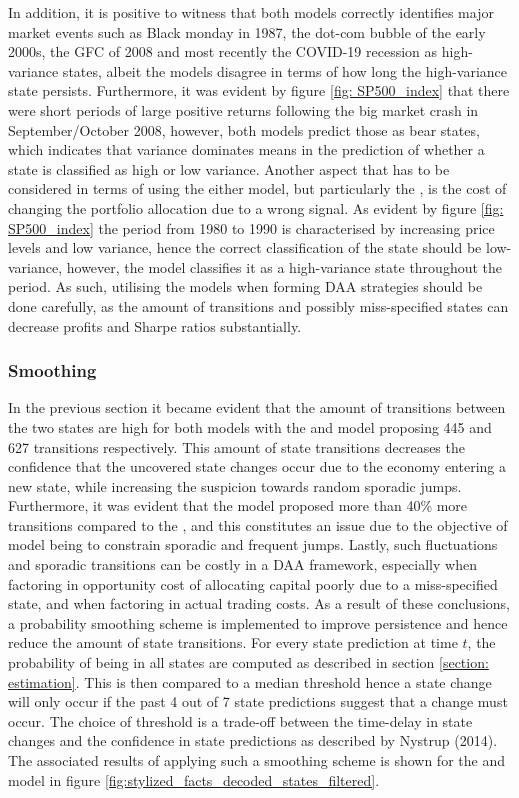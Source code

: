 In addition, it is positive to witness that both models correctly identifies major market events such as Black monday in 1987, the dot-com bubble of the early 2000s, the GFC of 2008 and most recently the COVID-19 recession as high-variance states, albeit the models disagree in terms of how long the high-variance state persists. Furthermore, it was evident by figure \ref{fig: SP500_index} that there were short periods of large positive returns following the big market crash in September/October 2008, however, both models predict those as bear states, which indicates that variance dominates means in the prediction of whether a state is classified as high or low variance. Another aspect that has to be considered in terms of using the either model, but particularly the \jump, is the cost of changing the portfolio allocation due to a wrong signal. As evident by figure \ref{fig: SP500_index} the period from 1980 to 1990 is characterised by increasing price levels and low variance, hence the correct classification of the state should be low-variance, however, the \jump model classifies it as a high-variance state throughout the period. As such, utilising the models when forming DAA strategies should be done carefully, as the amount of transitions and possibly miss-specified states can decrease profits and Sharpe ratios substantially.  

\subsubsection{Smoothing}
In the previous section it became evident that the amount of transitions between the two states are high for both models with the \mle and \jump model proposing 445 and 627 transitions respectively. This amount of state transitions decreases the confidence that the uncovered state changes occur due to the economy entering a new state, while increasing the suspicion towards random sporadic jumps. Furthermore, it was evident that the \jump model proposed more than 40\% more transitions compared to the \mle, and this constitutes an issue due to the objective of \jump model being to constrain sporadic and frequent jumps. Lastly, such fluctuations and sporadic transitions can be costly in a DAA framework, especially when factoring in opportunity cost of allocating capital poorly due to a miss-specified state, and when factoring in actual trading costs. As a result of these conclusions, a probability smoothing scheme is implemented to improve persistence and hence reduce the amount of state transitions. For every state prediction at time $t$, the probability of being in all states are computed as described in section \ref{section: estimation}. This is then compared to a median threshold hence a state change will only occur if the past 4 out of 7 state predictions suggest that a change must occur. The choice of threshold is a trade-off between the time-delay in state changes and the confidence in state predictions as described by Nystrup (2014). The associated results of applying such a smoothing scheme is shown for the \mle and \jump model in figure \ref{fig:stylized_facts_decoded_states_filtered}.

